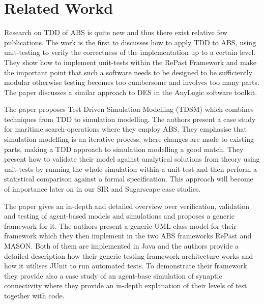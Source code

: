 \section{Related Workd}
\label{sec:related}

Research on TDD of ABS is quite new and thus there exist relative few publications. The work \cite{collier_test-driven_2013} is the first to discusses how to apply TDD to ABS, using unit-testing to verify the correctness of the implementation up to a certain level. They show how to implement unit-tests within the RePast Framework \cite{north_complex_2013} and make the important point that such a software needs to be designed to be sufficiently modular otherwise testing becomes too cumbersome and involves too many parts. The paper \cite{asta_investigation_2014} discusses a similar approach to DES in the AnyLogic software toolkit. 

The paper \cite{onggo_test-driven_2016} proposes Test Driven Simulation Modelling (TDSM) which combines techniques from TDD to simulation modelling. The authors present a case study for maritime search-operations where they employ ABS. They emphasise that simulation modelling is an iterative process, where changes are made to existing parts, making a TDD approach to simulation modelling a good match. They present how to validate their model against analytical solutions from theory using unit-tests by running the whole simulation within a unit-test and then perform a statistical comparison against a formal specification. This approach will become of importance later on in our SIR and Sugarscape case studies.


The paper \cite{gurcan_generic_2013} gives an in-depth and detailed overview over verification, validation and testing of agent-based models and simulations and proposes a generic framework for it. The authors present a generic UML class model for their framework which they then implement in the two ABS frameworks RePast and MASON. Both of them are implemented in Java and the authors provide a detailed description how their generic testing framework architecture works and how it utilises JUnit to run automated tests. To demonstrate their framework they provide also a case study of an agent-base simulation of synaptic connectivity where they provide an in-depth explanation of their levels of test together with code.

